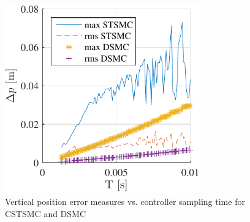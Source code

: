 \documentclass{ifacconf}
\begin{document}
\begin{figure}
\begin{center}
\includegraphics[width=8.4cm]{CSTSMC-DSMC-error-z-samplingtime.pdf}    %
\caption{Vertical position error measures vs. controller sampling time for CSTSMC and DSMC}
\label{fig:cst}
\end{center}
\end{figure}

\end{document}
